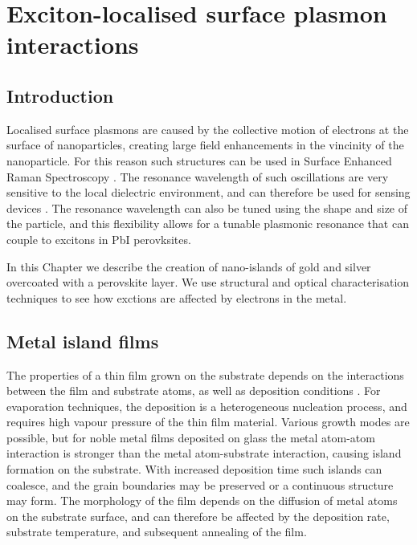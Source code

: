
\chapter{Exciton-localised surface plasmon interactions}

\graphicspath{{Chapter6/Figures/}}

\section{Introduction}
Localised surface plasmons are caused by the collective motion of electrons at the surface of nanoparticles, creating large field enhancements in the vincinity of the nanoparticle. For this reason such structures can be used in Surface Enhanced Raman Spectroscopy \cite{Cade2009, Olson2001, Talley2005}. The resonance wavelength of such oscillations are very sensitive to the local dielectric environment, and can therefore be used for sensing devices \cite{Jensen2000, Xu2004, Malinsky2001, Royer1987}. The resonance wavelength can also be tuned using the shape and size of the particle, and this flexibility allows for a tunable plasmonic resonance that can couple to excitons in PbI perovksites.

In this Chapter we describe the creation of nano-islands of gold and silver overcoated with a perovskite layer. We use structural and optical characterisation techniques to see how exctions are affected by electrons in the metal.

\section{Metal island films}
The properties of a thin film grown on the substrate depends on the interactions between the film and substrate atoms, as well as deposition conditions \cite{Kaiser2002}. For evaporation techniques, the deposition is a heterogeneous nucleation process, and requires high vapour pressure of the thin film material. Various growth modes are possible, but for noble metal films deposited on glass the metal atom-atom interaction is stronger than the metal atom-substrate interaction, causing island formation on the substrate. With increased deposition time such islands can coalesce, and the grain boundaries may be preserved or a continuous structure may form. The morphology of the film depends on the diffusion of metal atoms on the substrate surface, and can therefore be affected by the deposition rate, substrate temperature, and subsequent annealing of the film.

